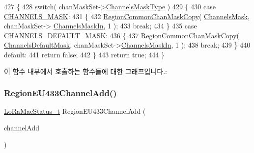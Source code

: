 \begin{DoxyCode}
427 \{
428     \textcolor{keywordflow}{switch}( chanMaskSet->\mbox{\hyperlink{structs_chan_mask_set_params_a02b75be74cbc34fa2126b2c250ea9283}{ChannelsMaskType}} )
429     \{
430         \textcolor{keywordflow}{case} \mbox{\hyperlink{group___r_e_g_i_o_n_gga7a62e669f567fc160ad58210664bca9ca1e68275c0b16a0c4935eada4315dd089}{CHANNELS\_MASK}}:
431         \{
432             \mbox{\hyperlink{group___r_e_g_i_o_n_c_o_m_m_o_n_ga95f5199d490113269fae7f2e0569e9a0}{RegionCommonChanMaskCopy}}( \mbox{\hyperlink{_region_e_u433_8c_a2188957b5ca6af8092154d7ccbfa5757}{ChannelsMask}}, chanMaskSet->
      \mbox{\hyperlink{structs_chan_mask_set_params_ade387d6ecaf27781b14ad97ebdfc0695}{ChannelsMaskIn}}, 1 );
433             \textcolor{keywordflow}{break};
434         \}
435         \textcolor{keywordflow}{case} \mbox{\hyperlink{group___r_e_g_i_o_n_gga7a62e669f567fc160ad58210664bca9ca9bbb18c8600ad8781ba04a2cb121ea60}{CHANNELS\_DEFAULT\_MASK}}:
436         \{
437             \mbox{\hyperlink{group___r_e_g_i_o_n_c_o_m_m_o_n_ga95f5199d490113269fae7f2e0569e9a0}{RegionCommonChanMaskCopy}}( 
      \mbox{\hyperlink{_region_e_u433_8c_ac127b19779301713d5ed92eb03366a2d}{ChannelsDefaultMask}}, chanMaskSet->\mbox{\hyperlink{structs_chan_mask_set_params_ade387d6ecaf27781b14ad97ebdfc0695}{ChannelsMaskIn}}, 1 );
438             \textcolor{keywordflow}{break};
439         \}
440         \textcolor{keywordflow}{default}:
441             \textcolor{keywordflow}{return} \textcolor{keyword}{false};
442     \}
443     \textcolor{keywordflow}{return} \textcolor{keyword}{true};
444 \}
\end{DoxyCode}
이 함수 내부에서 호출하는 함수들에 대한 그래프입니다.\+:
\mbox{\label{group___r_e_g_i_o_n_e_u433_ga477a869bd33f0fc4a1104e1a2097418a}} 
\subsubsection{\texorpdfstring{Region\+E\+U433\+Channel\+Add()}{RegionEU433ChannelAdd()}}
{\footnotesize\ttfamily \mbox{\hyperlink{group___l_o_r_a_m_a_c_ga30bd25657e10480f8605ee951b0ecfbd}{Lo\+Ra\+Mac\+Status\+\_\+t}} Region\+E\+U433\+Channel\+Add (\begin{DoxyParamCaption}\item[{\mbox{\hyperlink{group___r_e_g_i_o_n_gab1c5f3aa06614283202906cef4417860}{Channel\+Add\+Params\+\_\+t}} $\ast$}]{channel\+Add }\end{DoxyParamCaption})}



